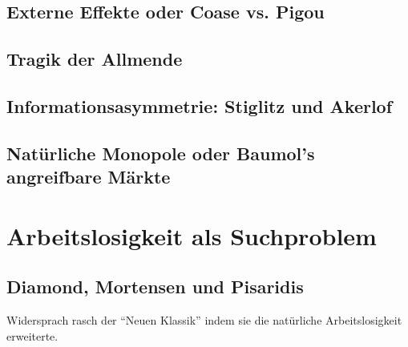 \subsection{Externe Effekte oder Coase vs. Pigou}

\subsection{Tragik der Allmende}

\subsection{Informationsasymmetrie: Stiglitz und Akerlof}

\subsection{Natürliche Monopole oder Baumol's angreifbare Märkte}


\section{Arbeitslosigkeit als Suchproblem}
\label{Suchtheorie}

\subsection{Diamond, Mortensen und Pisaridis}

Widersprach rasch der "`Neuen Klassik"' indem sie die natürliche Arbeitslosigkeit erweiterte.




